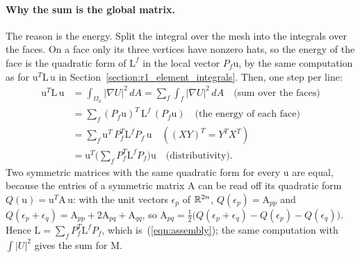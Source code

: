 \paragraph{Why the sum is the global matrix.} The reason is the energy. Split the integral over the mesh into the integrals over the faces. On a face only its three vertices have nonzero hats, so the energy of the face is the quadratic form of $\mathrm L^f$ in the local vector $P_f\mathrm u$, by the same computation as for $\mathrm u^T\mathrm L\,\mathrm u$ in Section~\ref{section:r1_element_integrals}. Then, one step per line:
\begin{align*}
\mathrm u^T\mathrm L\,\mathrm u &= \int_{\Omega_h} |\nabla U|^2\, dA = \sum_f \int_f |\nabla U|^2\, dA \quad \text{(sum over the faces)}\\
&= \sum_f (P_f\mathrm u)^T\, \mathrm L^f\, (P_f\mathrm u) \quad \text{(the energy of each face)}\\
&= \sum_f \mathrm u^T\, P_f^T\mathrm L^f P_f\, \mathrm u \quad ((XY)^T = Y^TX^T)\\
&= \mathrm u^T\Big(\sum_f P_f^T\mathrm L^f P_f\Big)\mathrm u \quad \text{(distributivity)} .
\end{align*}
Two symmetric matrices with the same quadratic form for every $\mathrm u$ are equal, because the entries of a symmetric matrix $\mathrm A$ can be read off its quadratic form $Q(\mathrm u) = \mathrm u^T\mathrm A\,\mathrm u$: with the unit vectors $\epsilon_p$ of $\mathbb{R}^{2n}$, $Q(\epsilon_p) = \mathrm A_{pp}$ and $Q(\epsilon_p + \epsilon_q) = \mathrm A_{pp} + 2\mathrm A_{pq} + \mathrm A_{qq}$, so $\mathrm A_{pq} = \frac12\big(Q(\epsilon_p + \epsilon_q) - Q(\epsilon_p) - Q(\epsilon_q)\big)$. Hence $\mathrm L = \sum_f P_f^T\mathrm L^f P_f$, which is~(\ref{eqn:assembly}); the same computation with $\int|U|^2$ gives the sum for $\mathrm M$.


